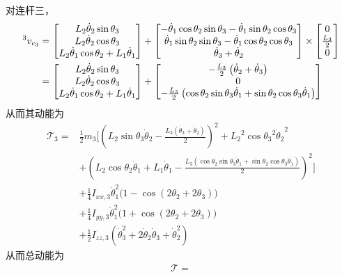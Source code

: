 \documentclass{ctexart}
\begin{document}
对连杆三，
\[
    \begin{aligned}
        \prescript{3}{}{v_{c_3}} & = \begin{bmatrix}
            {L_2} \dot\theta_2 \sin\theta_3\\
                {L_2} \dot\theta_2 \cos\theta_3\\
                {L_2} \dot\theta_1 \cos\theta_2 + L_1 \dot \theta_1
        \end{bmatrix} + \begin{bmatrix}
            -\dot\theta_1 \cos\theta_2 \sin\theta_3 -\dot\theta_1 \sin\theta_2 \cos\theta_3\\
            \dot\theta_1 \sin\theta_2 \sin\theta_3 - \dot\theta_1 \cos\theta_2 \cos\theta_3\\
            \dot\theta_3 + \dot\theta_2
        \end{bmatrix} \times \begin{bmatrix}
            0 \\ \frac{L_3}{2} \\ 0 \\
        \end{bmatrix} \\
        & = \begin{bmatrix}
            {L_2} \dot\theta_2 \sin\theta_3\\
                {L_2} \dot\theta_2 \cos\theta_3\\
                {L_2} \dot\theta_1 \cos\theta_2 + L_1 \dot \theta_1
        \end{bmatrix} + \begin{bmatrix}
            - \frac{L_3}{2} \left( \dot \theta_2 + \dot \theta_3\right) \\
            0 \\
            - \frac{{L_3}}{2}  \left( \cos\theta_2 \sin\theta_3 \dot\theta_1 + \sin\theta_2 \cos\theta_3 \dot\theta_1 \right) 
        \end{bmatrix}
    \end{aligned}
\]
从而其动能为
\[
    \begin{aligned}
        \mathcal T_3 = & \frac{1}{2} m_3 \Big[ {{\left( {L_2} \sin\theta_3 \dot\theta_2-\frac{{L_3} \left( \dot\theta_3+\dot\theta_2\right) }{2}\right) }^{2}}+{{{L_2}}^{2}} {{\cos\theta_3}^{2}} {{\dot\theta_2}^{2}} \\ 
        &+ {{\left( {L_2} \cos\theta_2 \dot\theta_1 + L_1 \dot \theta_1 -\frac{{L_3} \left( \cos\theta_2 \sin\theta_3 \dot\theta_1+\sin\theta_2 \cos\theta_3 \dot\theta_1\right) }{2}\right) }^{2}} \Big] \\
        &+ \frac{1}{4} I_{xx,3} \dot\theta_1^2 \big( 1 - \cos(2\theta_2 + 2\theta_3) \big) \\
        &+ \frac{1}{4} I_{yy,3} \dot\theta_1^2 \big( 1 + \cos(2\theta_2 + 2\theta_3) \big) \\
        &+ \frac{1}{2} I_{zz,3} (\dot\theta_3^2 + 2 \dot\theta_2 \dot\theta_3 + \dot\theta_2^2)
    \end{aligned}
\]
从而总动能为
\[
    \begin{aligned}
        \mathcal T = 
    \end{aligned}
\]
\end{document}

